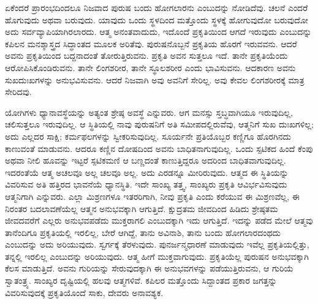 ಏಕೆಂದರೆ ಪ್ರಾರಂಭದಿಂದಲೂ ನಿಜವಾದ ಪುರುಷ ಬಂದು ಹೋಗಲಾರನು ಎಂಬುದನ್ನು ನೋಡಿದೆವು. ಚಲನೆ ಎಂದರೆ ಹೊಗುವುದು ಅಥವಾ ಬರುವುದು. ಯಾವುದು ಒಂದು ಸ್ಥಳದಿಂದ ಮತ್ತೊಂದು ಸ್ಥಳಕ್ಕೆ ಹೋಗುವುದೋ ಬರುವುದೋ ಅದು ಸರ್ವವ್ಯಾಪಿಯಾಗಿರಲಾರದು. ಆತ್ಮ ಅನಂತವಾದುದು, ಇದೊಂದೆ ಪ್ರಕೃತಿಯಿಂದ ಆಗದೆ ಇರುವುದು ಎಂಬುದನ್ನು ಕಪಿಲನ ಮನಶ್ಶಾಸ್ತ್ರದ ಸಿದ್ಧಾಂತದ ಮೂಲಕ ಅರಿತೆವು. ಪುರುಷನೊಬ್ಬನೆ ಪ್ರಕೃತಿಯ ಹೊರಗೆ ಇರುವವನು. ಆದರೆ ಅವನು ಪ್ರಕೃತಿಯಿಂದ ಬದ್ದನಾದಂತೆ ತೋರುತ್ತಿರುವನು. ಪ್ರಕೃತಿ ಅವನ ಸುತ್ತಲೂ ಇದೆ. ತಾನೇ ಪ್ರಕೃತಿಯೆಂದು ಆರೋಪಿಸಿಕೊಂಡಿರುವನು. ತಾನೇ ಲಿಂಗಶರೀರ, ತಾನೇ ಸ್ಥೂಲಶರೀರ ಎಂದು ಭಾವಿಸುವನು. ಆದಕಾರಣ ಅವನು ಸುಖದುಃಖಗಳನ್ನು ಅನುಭವಿಸುವನು. ಆದರೆ ನಿಜವಾಗಿ ಅವು ಅವನಿಗೆ ಸೇರಿಲ್ಲ. ಅವು ಕೇವಲ ಲಿಂಗಶರೀರಕ್ಕೆ ಮಾತ್ರ ಸೇರಿದವು.

ಯೋಗಿಗಳು ಧ್ಯಾನಾವಸ್ಥೆಯನ್ನು ಅತ್ಯಂತ ಶ್ರೇಷ್ಠ ಅವಸ್ಥೆ ಎನ್ನುವರು. ಆಗ ಮನಸ್ಸು ಸ್ತಬ್ಧವಾಗಿಯೂ ಇರುವುದಿಲ್ಲ, ಚಲಿಸುತ್ತಲೂ ಇರುವುದಿಲ್ಲ. ಆ ಸ್ಥಿತಿಯಲ್ಲಿ ನಾವು ಪುರುಷನಿಗೆ ಅತಿ ಸಮೀಪದಲ್ಲಿರುವೆವು, ಆತ್ಮನಿಗೆ ಸುಖ ದುಃಖಗಳಿಲ್ಲ; ಅದು ಎಲ್ಲದರ ಸಾಕ್ಷಿ; ಕರ್ಮಫಲಗಳನ್ನು ಸ್ವೀಕರಿಸುವುದಿಲ್ಲ. ಸೂರ್ಯನೇ ಪ್ರತಿಯೊಬ್ಬರ ಕಣ್ಣಿಗೂ ಹೊರಗಿನದು ಕಾಣುವಂತೆ ಮಾಡುವನು. ಆದರೂ ಕಣ್ಣಿನ ದೋಷದಿಂದ ಅವನು ಬಾಧಿತನಾಗುವುದಿಲ್ಲ. ಒಂದು ಸ್ಪಟಿಕದ ಹಿಂದೆ ಕೆಂಪು ಅಥವಾ ನೀಲಿ ಹೂವನ್ನು ಇಟ್ಟರೆ ಸ್ಪಟಿಕಮಣಿ ಆ ಬಣ್ಣದಂತೆ ಕಾಣುತ್ತಿದ್ದರೂ ಅದರಿಂದ ಬಾಧಿತವಾಗುವುದಿಲ್ಲ. ಇದರಂತೆಯೆ ಆತ್ಮ ಅಚಲವೂ ಅಲ್ಲ ಚಲವೂ ಅಲ್ಲ. ಅದು ಎರಡನ್ನೂ ಮೀರಿರುವುದು. ಆತ್ಮದ ಈ ಸ್ಥಿತಿಯನ್ನು ವಿವರಿಸುವ ಅತಿ ಹತ್ತಿರದ ಭಾವನೆಯೆ ಧ್ಯಾನಸ್ಥಿತಿ. ಇದೇ ಸಾಂಖ್ಯ ತತ್ತ್ವ, ಸಾಂಖ್ಯರು ಪ್ರಕೃತಿ ಆವಿರ್ಭವಿಸುವುದು ಆತ್ಮನಿಗಾಗಿ ಎನ್ನುವರು. ಎಲ್ಲಾ ಮಿಶ್ರಣಗಳೂ ಇತರರಿಗಾಗಿ, ನೀವು ಪ್ರಕೃತಿ ಎಂದು ಕರೆಯುವ ಈ ಮಿಶ್ರಣವೆಲ್ಲ, ಈ ನಿರಂತರ ಬದಲಾವಣೆಯೆಲ್ಲ ಆತ್ಮನ ಅನುಭವಕ್ಕಾಗಿ ಆಗುತ್ತಿದೆ. ಕ್ಷುದ್ರತಮ ಜೀವದಿಂದ ಹಿಡಿದು ಶ್ರೇಷ್ಠತಮ ಜೀವದವರೆಗೆ ಎಲ್ಲರು ಅನುಭವಪಡೆದು ಮುಕ್ತರಾಗಲಿ ಎಂಬುದಕ್ಕಾಗಿ ಇದು ಆಗುತ್ತಿದೆ. ಇದನ್ನು ಪಡೆದ ಮೇಲೆ ಆತ್ಮವು ತಾನೆಂದಿಗೂ ಪ್ರಕೃತಿಯಲ್ಲಿ ಇರಲಿಲ್ಲ, ಬೇರೆ ಆಗಿದ್ದೆ, ತಾನು ಅವಿನಾಶಿ, ತಾನು ಬಂದು ಹೋಗಲಾರದಂಥದು ಎಂಬುದನ್ನು ಅದು ಅರಿಯುವುದು. ಸ್ವರ್ಗಕ್ಕೆ ತೆರಳುವುದು. ಪುನರ್ಜನ್ಮಧಾರಣೆ ಮಾಡುವುದು ಇವೆಲ್ಲ ಪ್ರಕೃತಿಯಲ್ಲಿತ್ತು, ತನ್ನಲ್ಲಿ ಇರಲಿಲ್ಲ ಎಂಬುದನ್ನು ಅರಿಯುವುದು. ಆತ್ಮ ಹೀಗೆ ಮುಕ್ತವಾಗುವುದು. ಪ್ರಕೃತಿಯೆಲ್ಲ ಪುರುಷನ ಅನುಭವಕ್ಕಾಗಿ ಕೆಲಸ ಮಾಡುತ್ತಿದೆ. ಅವನು ಗುರಿಯನ್ನು ಸೇರುವುದಕ್ಕಾಗಿ ಈ ಅನುಭವಗಳನ್ನು ಪಡೆಯುತ್ತಿರುವನು, ಆ ಗುರಿಯೆ ಸ್ವಾತಂತ್ರ್ಯ. ಸಾಂಖ್ಯರ ದೃಷ್ಟಿಯಲ್ಲಿ ಹಲವು ಆತ್ಮಗಳಿವೆ. ಕಪಿಲರ ಮತ್ತೊಂದು ಸಿದ್ದಾಂತದ ಪ್ರಕಾರ ಜಗತ್ತನ್ನು ವಿವರಿಸುವುದಕ್ಕೆ ಪ್ರಕೃತಿಯೊಂದೆ ಸಾಕು, ದೇವರು ಅನಾವಶ್ಯಕ.

